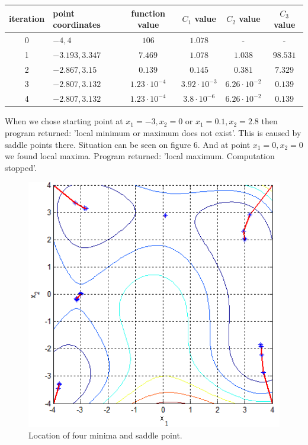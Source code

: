 \documentclass[12pt]{article}
\begin{document}
\begin{table}[H]
	\begin{tabularx}{\textwidth}{c|X|c|c|c|c|}
		iteration & point coordinates & function value & $C_1$ value & $C_2$ value & $C_3$ value\\
		\hline
		0 & $-4, 4$ & $106$ & $1.078$ & - & - \\
		\hline
		1 & $-3.193, 3.347$ & $7.469$ & $1.078$ & $1.038$ & $98.531$ \\
		\hline
		2 & $-2.867, 3.15$ & $0.139$ & $0.145$ & $0.381$ & $7.329$ \\
		\hline
		3 & $-2.807, 3.132$ & $1.23\cdot10^{-4}$ & $3.92\cdot10^{-3}$ & $6.26\cdot10^{-2}$ & $0.139$ \\
		\hline
		4 & $-2.807, 3.132$ & $1.23\cdot10^{-4}$ & $3.8\cdot10^{-6}$ & $6.26\cdot10^{-2}$ & $0.139$ \\ 
		\hline
	\end{tabularx}	
\end{table}	
When we chose starting point at $x_1=-3, x_2=0$ or $x_1=0.1, x_2=2.8$ then program returned: 'local minimum or maximum does not exist'. This is caused by saddle points there. Situation can be seen on figure 6. And at point $x_1=0, x_2=0$ we found local maxima. Program returned: 'local maximum. Computation stopped'. 
\begin{figure}[H]
	\begin{center}
		\includegraphics[width=16cm]{himm_results.png}
		\caption{Location of four minima and saddle point.}
	\end{center}
\end{figure} 
\end{document}
